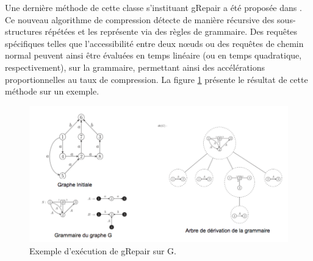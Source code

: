 
	Une dernière méthode de cette classe s'instituant gRepair a été proposée dans \citep{maneth2018grammar}. Ce nouveau algorithme de compression détecte de manière récursive des sous-structures répétées et les représente via des règles de grammaire.  Des requêtes spécifiques telles que l'accessibilité entre deux nœuds ou des requêtes de chemin normal peuvent ainsi être évaluées en temps linéaire (ou en temps quadratique, respectivement), sur la grammaire, permettant ainsi des accélérations proportionnelles au taux de compression. La figure \ref{gRepair} présente le résultat de cette méthode sur un exemple. 
	
	\begin{figure}[h]
			\includegraphics[scale=0.5,center]{./ressources/image/grepair.png}
			\caption[Exemple d'exécution de gRepair sur G.]{Exemple d'exécution de gRepair sur G.}
			\label{gRepair}
	\end{figure}